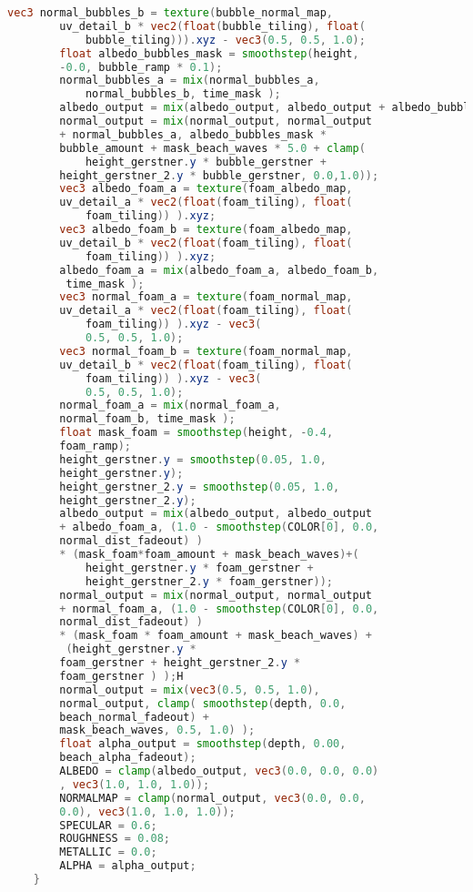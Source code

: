 \begin{lstlisting}[language=GLSL, caption={\label{cf:agua} \textit{Shader} de efeito de água na Unity}]
		vec3 normal_bubbles_b = texture(bubble_normal_map, 
		uv_detail_b * vec2(float(bubble_tiling), float(
			bubble_tiling))).xyz - vec3(0.5, 0.5, 1.0);
		float albedo_bubbles_mask = smoothstep(height, 
		-0.0, bubble_ramp * 0.1);
		normal_bubbles_a = mix(normal_bubbles_a, 
			normal_bubbles_b, time_mask );
		albedo_output = mix(albedo_output, albedo_output + albedo_bubbles_a, albedo_bubbles_mask * bubble_amount + mask_beach_waves * 5.0 + height_gerstner.y * bubble_gerstner + height_gerstner_2.y * bubble_gerstner );
		normal_output = mix(normal_output, normal_output 
		+ normal_bubbles_a, albedo_bubbles_mask * 
		bubble_amount + mask_beach_waves * 5.0 + clamp(
			height_gerstner.y * bubble_gerstner + 
		height_gerstner_2.y * bubble_gerstner, 0.0,1.0));
		vec3 albedo_foam_a = texture(foam_albedo_map, 
		uv_detail_a * vec2(float(foam_tiling), float(
			foam_tiling)) ).xyz;
		vec3 albedo_foam_b = texture(foam_albedo_map, 
		uv_detail_b * vec2(float(foam_tiling), float(
			foam_tiling)) ).xyz;
		albedo_foam_a = mix(albedo_foam_a, albedo_foam_b,
		 time_mask );
		vec3 normal_foam_a = texture(foam_normal_map, 
		uv_detail_a * vec2(float(foam_tiling), float(
			foam_tiling)) ).xyz - vec3(
			0.5, 0.5, 1.0);
		vec3 normal_foam_b = texture(foam_normal_map, 
		uv_detail_b * vec2(float(foam_tiling), float(
			foam_tiling)) ).xyz - vec3(
			0.5, 0.5, 1.0);
		normal_foam_a = mix(normal_foam_a, 
		normal_foam_b, time_mask );
		float mask_foam = smoothstep(height, -0.4, 
		foam_ramp);
		height_gerstner.y = smoothstep(0.05, 1.0, 
		height_gerstner.y);
		height_gerstner_2.y = smoothstep(0.05, 1.0, 
		height_gerstner_2.y);
		albedo_output = mix(albedo_output, albedo_output 
		+ albedo_foam_a, (1.0 - smoothstep(COLOR[0], 0.0, 
		normal_dist_fadeout) ) 
		* (mask_foam*foam_amount + mask_beach_waves)+(
			height_gerstner.y * foam_gerstner + 
			height_gerstner_2.y * foam_gerstner));
		normal_output = mix(normal_output, normal_output 
		+ normal_foam_a, (1.0 - smoothstep(COLOR[0], 0.0, 
		normal_dist_fadeout) ) 
		* (mask_foam * foam_amount + mask_beach_waves) +
		 (height_gerstner.y * 
		foam_gerstner + height_gerstner_2.y * 
		foam_gerstner ) );H
		normal_output = mix(vec3(0.5, 0.5, 1.0), 
		normal_output, clamp( smoothstep(depth, 0.0, 
		beach_normal_fadeout) + 
		mask_beach_waves, 0.5, 1.0) ); 
		float alpha_output = smoothstep(depth, 0.00, 
		beach_alpha_fadeout);
		ALBEDO = clamp(albedo_output, vec3(0.0, 0.0, 0.0)
		, vec3(1.0, 1.0, 1.0));
		NORMALMAP = clamp(normal_output, vec3(0.0, 0.0, 
		0.0), vec3(1.0, 1.0, 1.0));
		SPECULAR = 0.6;
		ROUGHNESS = 0.08;
		METALLIC = 0.0;
		ALPHA = alpha_output;
	}
	

\end{lstlisting}
